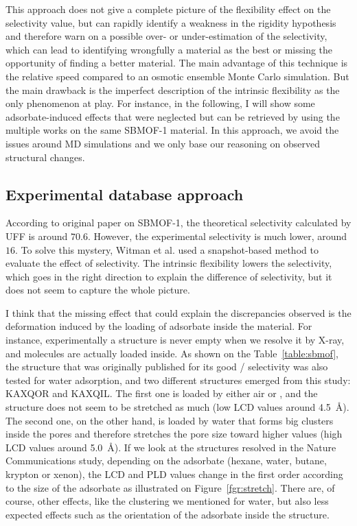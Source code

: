\documentclass[main]{subfiles}
\begin{document}
This approach does not give a complete picture of the flexibility effect on the selectivity value, but can rapidly identify a weakness in the rigidity hypothesis and therefore warn on a possible over- or under-estimation of the selectivity, which can lead to identifying wrongfully a material as the best or missing the opportunity of finding a better material. The main advantage of this technique is the relative speed compared to an osmotic ensemble Monte Carlo simulation.\autocite{Bousquet2012} But the main drawback is the imperfect description of the intrinsic flexibility as the only phenomenon at play. For instance, in the following, I will show some adsorbate-induced effects that were neglected but can be retrieved by using the multiple works on the same SBMOF-1 material. In this approach, we avoid the issues around MD simulations and we only base our reasoning on observed structural changes. 


\subsection{Experimental database approach}

According to original paper on SBMOF-1,\autocite{Banerjee_2016} the theoretical selectivity calculated by UFF is around $70.6$. However, the experimental selectivity is much lower, around $16$. To solve this mystery, Witman et al. used a snapshot-based method to evaluate the effect of selectivity. The intrinsic flexibility lowers the selectivity, which goes in the right direction to explain the difference of selectivity, but it does not seem to capture the whole picture. 

I think that the missing effect that could explain the discrepancies observed is the deformation induced by the loading of adsorbate inside the material. For instance, experimentally a structure is never empty when we resolve it by X-ray, and molecules are actually loaded inside. As shown on the Table~\ref{table:sbmof}, the structure that was originally published for its good / selectivity\autocite{Yeh2012,Banerjee2012} was also tested for water adsorption, and two different structures emerged from this study: KAXQOR and KAXQIL. The first one is loaded by either air or , and the structure does not seem to be stretched as much (low LCD values around \SI{4.5}{\angstrom}). The second one, on the other hand, is loaded by water that forms big clusters inside the pores and therefore stretches the pore size toward higher values (high LCD values around \SI{5.0}{\angstrom}). If we look at the structures resolved in the Nature Communications study\autocite{Banerjee_2016}, depending on the adsorbate (hexane, water, butane, krypton or xenon), the LCD and PLD values change in the first order according to the size of the adsorbate as illustrated on Figure~\ref{fgr:stretch}. There are, of course, other effects, like the clustering we mentioned for water, but also less expected effects such as the orientation of the adsorbate inside the structure. 
\end{document}
